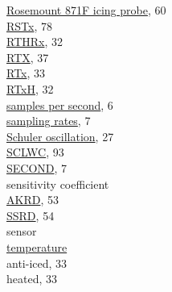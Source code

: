 \documentclass[
]{article}
\begin{document}
\href{./5-cloud-physics-variables.html\#rice}{Rosemount 871F icing
probe}, 60\\
\href{./8-radiation-variables.html\#rstx}{RSTx}, 78\\
\href{./4-the-state-of-the-atmosphere.html\#recovery-t}{RTHRx}, 32\\
\href{./4-the-state-of-the-atmosphere.html\#recovery-t}{RTX}, 37\\
\href{./4-the-state-of-the-atmosphere.html\#recovery-t\%7C}{RTx}, 33\\
\href{./4-the-state-of-the-atmosphere.html\#recovery-t}{RTxH}, 32\\
\href{./2-general-information-about-data-files.html\#units-and-abbreviations}{samples
per second}, 6\\
\href{./2-general-information-about-data-files.html\#synchronization-of-measurements}{sampling
rates}, 7\\
\href{./3-the-state-of-the-aircraft.html\#inertial-reference-systems}{Schuler
oscillation}, 27\\
\href{./10-obsolete-variables.html\#sclwc}{SCLWC}, 93\\
\href{./2-general-information-about-data-files.html\#hms\%7C}{SECOND},
7\\
sensitivity coefficient\\
\hspace*{0.333em}\hspace*{0.333em}\href{./4-the-state-of-the-atmosphere.html\#akrd}{AKRD},
53\\
\hspace*{0.333em}\hspace*{0.333em}\href{./4-the-state-of-the-atmosphere.html\#ssrd}{SSRD},
54\\
sensor\\
\hspace*{0.333em}\hspace*{0.333em}\href{./4-the-state-of-the-atmosphere.html\#recovery-t}{temperature}\\
\hspace*{0.333em}\hspace*{0.333em}\hspace*{0.333em}\hspace*{0.333em}anti-iced,
33\\
\hspace*{0.333em}\hspace*{0.333em}\hspace*{0.333em}\hspace*{0.333em}heated,
33\\
\end{document}
